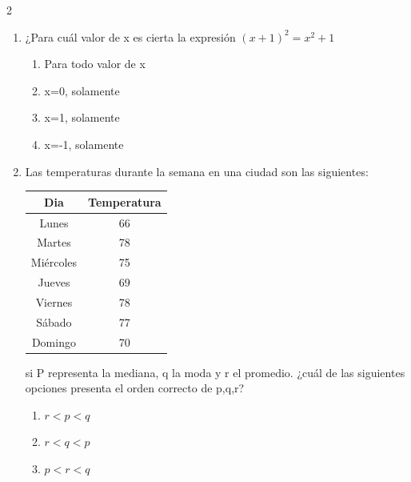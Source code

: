\documentclass[10.5pt,letterpaper]{article}
\begin{document}
\begin{multicols}{2}
\begin{enumerate}
\begin{minipage}{0.5\linewidth}
\begin{enumerate}
\item[b)] $|x-4|>6$
\end{enumerate}
\end{minipage}\\
\begin{minipage}{0.5\linewidth}
\begin{enumerate}
\item[c)] $|x-5|>5$
\end{enumerate}
\end{minipage}\\
\begin{minipage}{0.5\linewidth}
\begin{enumerate}
\item[d)]$|x-6|>4$
\end{enumerate}
\end{minipage}
\item ¿Para cuál valor de x es cierta la expresión $(x+1)^2=x^2+1$
\begin{enumerate}
\item Para todo valor de x
\item x=0, solamente
\item x=1, solamente
\item x=-1, solamente
\end{enumerate}
\item Las temperaturas durante la semana en una ciudad son las siguientes:
\begin{center}
\begin{tabular}{|c|c|}
\hline
Dia & Temperatura\\ \hline
Lunes & 66\\ \hline
Martes & 78\\ \hline
Miércoles & 75\\ \hline
Jueves & 69\\ \hline
Viernes & 78\\ \hline
Sábado & 77\\ \hline
Domingo & 70\\ \hline
\end{tabular}
\end{center}
si P representa la mediana, q la moda y r el promedio. ¿cuál de las siguientes opciones presenta el orden correcto de p,q,r?
\begin{enumerate}
\item $r<p<q$
\item $r<q<p$
\item $p<r<q$

\end{enumerate}
\end{enumerate}
\end{multicols}
\end{document}
